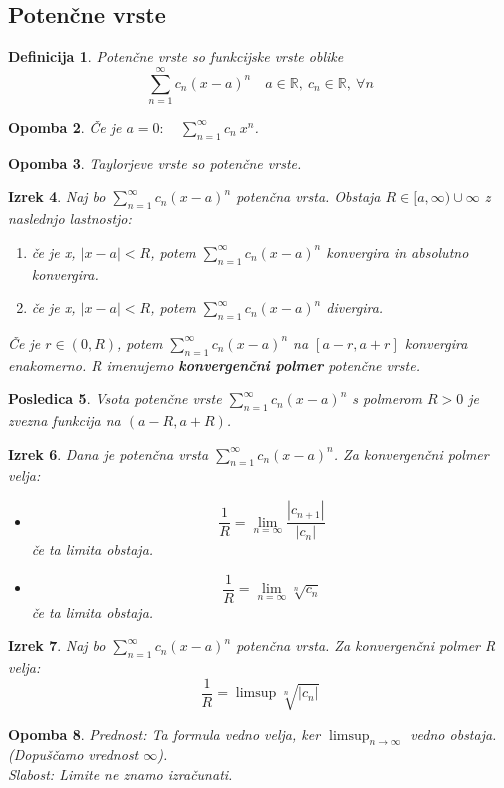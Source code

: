 \documentclass[11pt]{article}
\newtheorem{Izrek}{{\sc Izrek}}[section]
\newtheorem{Posledica}[Izrek]{{\sc Posledica}}
\newtheorem{Definicija}[Izrek]{{\sc Definicija}}
\newtheorem{Opomba}[Izrek]{{\sc Opomba}}
\begin{document}
\subsection{Potenčne vrste}
\begin{Definicija}
	Potenčne vrste so funkcijske vrste oblike
	$$\sum_{n=1}^{\infty}{c_n(x-a)^n} \quad a\in\mathbb{R},\ c_n\in\mathbb{R},\ \forall n$$
\end{Definicija}
\begin{Opomba}
	Če je $a =0:\quad \sum_{n= 1}^{\infty}{c_n\ x^n}$. 
\end{Opomba}
\begin{Opomba}
	Taylorjeve vrste so potenčne vrste.
\end{Opomba}
\begin{Izrek}
	Naj bo $\sum_{n=1}^{\infty}{c_n(x-a)^n}$ potenčna vrsta. Obstaja $R\in [a,\infty) \cup \infty$ z naslednjo lastnostjo:
	\begin{enumerate}
		\item
		če je x, $|x-a| < R$, potem  $\sum_{n=1}^{\infty}{c_n(x-a)^n}$ konvergira in absolutno konvergira.
		\item
		če je x, $|x-a| < R$, potem  $\sum_{n=1}^{\infty}{c_n(x-a)^n}$ divergira.
	\end{enumerate}
	Če je $r\in (0, R)$, potem  $\sum_{n=1}^{\infty}{c_n(x-a)^n}$ na  $[a-r, a+r]$ konvergira enakomerno.
	R imenujemo \textbf{konvergenčni polmer} potenčne vrste.
\end{Izrek}
\begin{Posledica}
	Vsota potenčne vrste $\sum_{n=1}^{\infty}{c_n(x-a)^n}$ s polmerom $R > 0$ je zvezna funkcija na $(a-R, a+R)$.
\end{Posledica}
\begin{Izrek}
	Dana je potenčna vrsta $\sum_{n=1}^{\infty}{c_n(x-a)^n}$. Za konvergenčni polmer velja:
	\begin{itemize}
		\item
		$$\frac{1}{R} = \lim\limits_{n = \infty}{\frac{|c_{n+1}|}{|c_n|}}$$
		če ta limita obstaja.
		\item
		$$\frac{1}{R} = \lim\limits_{n = \infty}{\sqrt[n]{c_n}}$$
		če ta limita obstaja.
	\end{itemize}
\end{Izrek}
\begin{Izrek}
	Naj bo $\sum_{n=1}^{\infty}{c_n(x-a)^n}$ potenčna vrsta. Za konvergenčni polmer R velja:
	$$\frac{1}{R} = \limsup{\sqrt[n]{|c_n|}}$$
\end{Izrek}
\begin{Opomba}
	Prednost: Ta formula vedno velja, ker $\limsup_{n\to \infty}$ vedno obstaja. (Dopuščamo vrednost $\infty$).
	\\
	Slabost: Limite ne znamo izračunati.
\end{Opomba}
\end{document}
